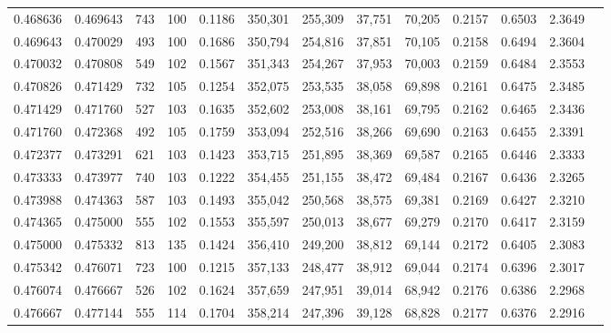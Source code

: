 \begin{tabular}{rrrrrrrrrrrrr}
0.468636 & 0.469643 &    743 &   100 &                                     0.1186 & 350,301 & 255,309 &  37,751 &  70,205 & 0.2157 & 0.6503 & 2.3649 \\
0.469643 & 0.470029 &    493 &   100 &                                     0.1686 & 350,794 & 254,816 &  37,851 &  70,105 & 0.2158 & 0.6494 & 2.3604 \\
0.470032 & 0.470808 &    549 &   102 &                                     0.1567 & 351,343 & 254,267 &  37,953 &  70,003 & 0.2159 & 0.6484 & 2.3553 \\
0.470826 & 0.471429 &    732 &   105 &                                     0.1254 & 352,075 & 253,535 &  38,058 &  69,898 & 0.2161 & 0.6475 & 2.3485 \\
0.471429 & 0.471760 &    527 &   103 &                                     0.1635 & 352,602 & 253,008 &  38,161 &  69,795 & 0.2162 & 0.6465 & 2.3436 \\
0.471760 & 0.472368 &    492 &   105 &                                     0.1759 & 353,094 & 252,516 &  38,266 &  69,690 & 0.2163 & 0.6455 & 2.3391 \\
0.472377 & 0.473291 &    621 &   103 &                                     0.1423 & 353,715 & 251,895 &  38,369 &  69,587 & 0.2165 & 0.6446 & 2.3333 \\
0.473333 & 0.473977 &    740 &   103 &                                     0.1222 & 354,455 & 251,155 &  38,472 &  69,484 & 0.2167 & 0.6436 & 2.3265 \\
0.473988 & 0.474363 &    587 &   103 &                                     0.1493 & 355,042 & 250,568 &  38,575 &  69,381 & 0.2169 & 0.6427 & 2.3210 \\
0.474365 & 0.475000 &    555 &   102 &                                     0.1553 & 355,597 & 250,013 &  38,677 &  69,279 & 0.2170 & 0.6417 & 2.3159 \\
0.475000 & 0.475332 &    813 &   135 &                                     0.1424 & 356,410 & 249,200 &  38,812 &  69,144 & 0.2172 & 0.6405 & 2.3083 \\
0.475342 & 0.476071 &    723 &   100 &                                     0.1215 & 357,133 & 248,477 &  38,912 &  69,044 & 0.2174 & 0.6396 & 2.3017 \\
0.476074 & 0.476667 &    526 &   102 &                                     0.1624 & 357,659 & 247,951 &  39,014 &  68,942 & 0.2176 & 0.6386 & 2.2968 \\
0.476667 & 0.477144 &    555 &   114 &                                     0.1704 & 358,214 & 247,396 &  39,128 &  68,828 & 0.2177 & 0.6376 & 2.2916 \\

\end{tabular}
